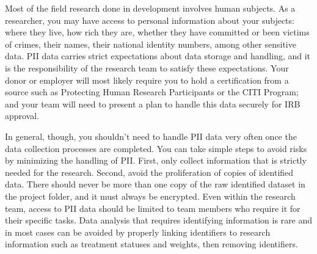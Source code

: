 Most of the field research done in development involves human subjects.
As a researcher, you may have access to personal information about your subjects:
where they live, how rich they are, whether they have committed or been victims of crimes,
their names, their national identity numbers, among other sensitive data.
PII data carries strict expectations about data storage and handling,
and it is the responsibility of the research team to satisfy these expectations.
Your donor or employer will most likely require you to hold a certification from a source
such as Protecting Human Research Participants
or the CITI Program;
and your team will need to present a plan to handle this data securely for IRB approval.

In general, though, you shouldn't need to handle PII data very often
once the data collection processes are completed.
You can take simple steps to avoid risks by minimizing the handling of PII.
First, only collect information that is strictly needed for the research.
Second, avoid the proliferation of copies of identified data.
There should never be more than one copy of the raw identified dataset in the project folder,
and it must always be encrypted.
Even within the research team,
access to PII data should be limited to team members who require it for their specific tasks.
Data analysis that requires identifying information is rare
and in most cases can be avoided by properly linking identifiers to research information
such as treatment statuses and weights, then removing identifiers.

